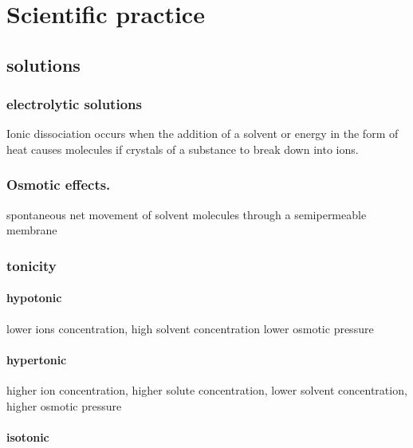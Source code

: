 \documentclass[]{article}
\date{}
\let\oldparagraph\paragraph
\renewcommand{\paragraph}[1]{\oldparagraph{#1}\mbox{}}
\begin{document}
\hypertarget{scientific-practice}{%
\section{Scientific practice}\label{scientific-practice}}

\hypertarget{solutions}{%
\subsection{solutions}\label{solutions}}

\hypertarget{electrolytic-solutions}{%
\subsubsection{electrolytic solutions}\label{electrolytic-solutions}}

Ionic dissociation occurs when the addition of a solvent or energy in
the form of heat causes molecules if crystals of a substance to break
down into ions.

\hypertarget{osmotic-effects.}{%
\subsubsection{Osmotic effects.}\label{osmotic-effects.}}

spontaneous net movement of solvent molecules through a semipermeable
membrane

\hypertarget{tonicity}{%
\subsubsection{tonicity}\label{tonicity}}

\hypertarget{hypotonic}{%
\paragraph{hypotonic}\label{hypotonic}}

lower ions concentration, high solvent concentration lower osmotic
pressure

\hypertarget{hypertonic}{%
\paragraph{hypertonic}\label{hypertonic}}

higher ion concentration, higher solute concentration, lower solvent
concentration, higher osmotic pressure

\hypertarget{isotonic}{%
\paragraph{isotonic}\label{isotonic}}
\end{document}
